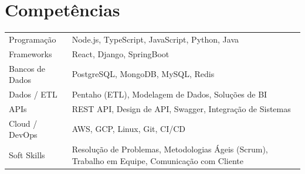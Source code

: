 \documentclass[a4paper,12pt]{article}
\begin{document}


    \section{Competências}
    \begin{tabularx}{\linewidth}{@{}l X@{}}
        Programação & Node.js, TypeScript, JavaScript, Python, Java \\
        Frameworks & React, Django, SpringBoot \\
        Bancos de Dados & PostgreSQL, MongoDB, MySQL, Redis \\
        Dados / ETL & Pentaho (ETL), Modelagem de Dados, Soluções de BI \\
        APIs & REST API, Design de API, Swagger, Integração de Sistemas \\
        Cloud / DevOps & AWS, GCP, Linux, Git, CI/CD \\
        Soft Skills & Resolução de Problemas, Metodologias Ágeis (Scrum), Trabalho em Equipe, Comunicação com Cliente \\
    \end{tabularx}


    \vfill
\end{document}
